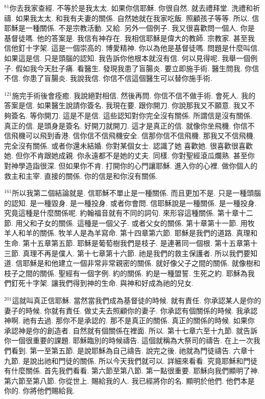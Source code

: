 \documentclass{book}
\begin{document}
$^{81}$你去我家查經.
不等於是我太太.
如果你信耶穌.
你很自然.
就去禮拜堂.
洗禮和祈禱.
如果我太太.
和我有夫妻的關係.
自然她就在我家吃飯.
照顧孩子等等.
所以.
信耶穌是一種關係.
不是宗教活動.
又給.
另外一個例子.
我又很喜歡問一個人.
你是基督徒嗎.
他的答案是.
我信有神存在.
我相信耶穌是偉大的教師.
宗教家.
甚至我信他釘十字架.
這是一個崇高的.
博愛精神.
你以為他是基督徒嗎.
問題是什麼叫信.
如果這是信.
只是頭腦的認知.
我告訴你他根本就沒有信.
何以見得呢.
我舉一個例子.
假如我今天肚子痛.
看醫生.
發現我患了盲腸炎.
要立即施手術.
醫生問我.
你信不信.
你患了盲腸炎.
我說我信.
你信不信這個醫生可以替你施手術.

$^{121}$施完手術後會痊癒.
我說絕對相信.
然後再問.
你信不信不做手術.
會死人.
我的答案是信.
如果醫生說請你簽名.
我現在要.
跟你開刀.
你說那我又不願意.
我又不夠簽名.
等你開刀.
這是不是信.
這些認知對你完全沒有關係.
所謂信是沒有關係.
真正的信.
是頭身是簽名.
好開刀就開刀.
這才是真正的信.
就像你坐飛機.
你信不信飛機可以飛到香港.
信你信不信飛機安全.
信那你信不信飛機.
那我又不信飛機.
完全沒有關係.
或者你還未結婚.
你對某個女士.
認識了她 喜歡她.
很喜歡很喜歡她.
但你不肯跟她成親.
你永遠都不是她的丈夫.
同樣.
你對聖經滾瓜爛熟.
甚至你對神學造詣很深.
但如果你不肯.
打開你的心門讓耶穌.
進入你的心裡.
做你個人的救主和主宰.
直接的關係.
你的信是和你沒有關係.

$^{161}$所以我第二個結論就是.
信耶穌不單止是一種關係.
而且更加不是.
只是一種頭腦的認知.
是一種毀身.
是一種投身.
或者你會問.
信耶穌說是一種關係.
是一種投身.
究竟這種是什麼關係呢.
約翰福音就有不同的詞句.
來形容這種關係.
第十章十二節.
用父和子女的關係.
這種是一個父子.
或者父女的關係.
第十章第十一節.
用牧羊人和羊的關係.
牧羊人是為羊寫命.
第十四章第六節.
耶穌是我們的道路.
真理和生命.
第十五章第五節.
耶穌是葡萄樹我們是枝子.
是連著同一個根.
第十五章第十三節.
真理不再是僕人.
第十七章第十六節.
祂是我們的救主保護者.
所以我們要知道.
信耶穌是和他建立一個非常非常親密的關係.
就好像父子之間的關係.
就像樹和枝子之間的關係.
聖經有一個字例.
約的關係.
約是一種盟誓.
生死之約.
耶穌為我們釘死十字架.
讓我們得到神的生命.
與神和好成為祂的兒女.

$^{201}$這就叫真正信耶穌.
當然當我們成為基督徒的時候.
就有責任.
你承認某人是你的妻子的時候.
你就有責任.
做丈夫去照顧你的妻子.
你承認有個關係的時候.
我承認神啊.
祂有去過.
那你不是承認的.
那不是真正的關係.
真正的關係的時候.
如果你承認神是你的創造者.
自然就有個關係在裡面.
所以.
第十七章六至十九節.
就告訴你一個很重要的課題.
耶穌臨別的時候禱告.
這個就稱為大祭司的禱告.
在上一次我們看到.
第一至第五節.
是說耶穌為自己禱告.
說完之後.
祂就為門徒禱告.
六章十九節.
是說出祂和門徒的關係.
所以今天我們就可以.
詳細來看看.
究竟耶穌和門徒有什麼關係.
首先我們看看.
第六節至第八節.
第一點很重要.
耶穌向我們顯明了神.
第六節至第八節.
你從世上.
賜給我的人.
我已經將你的名.
顯明於他們.
他們本是你的.
你將他們賜給我.
\end{document}
